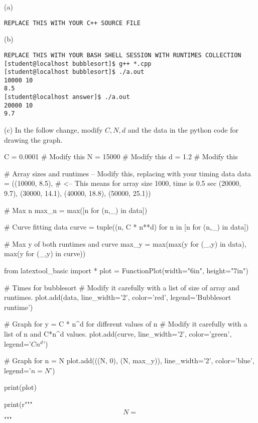 
(a)
\begin{Verbatim}[frame=single, fontsize=\small]
REPLACE THIS WITH YOUR C++ SOURCE FILE
\end{Verbatim}

(b)
\begin{Verbatim}[frame=single, fontsize=\small]
REPLACE THIS WITH YOUR BASH SHELL SESSION WITH RUNTIMES COLLECTION
[student@localhost bubblesort]$ g++ *.cpp
[student@localhost bubblesort]$ ./a.out
10000 10
8.5
[student@localhost answer]$ ./a.out
20000 10
9.7
\end{Verbatim}

(c) In the follow change, modify $C, N, d$ and the data in the
python code for drawing the graph.

\begin{python}
C = 0.0001                  # Modify this 
N = 15000                   # Modify this
d = 1.2                     # Modify this

# Array sizes and runtimes -- Modify this, replacing with your timing data
data = ((10000, 8.5),    # <-- This means for array size 1000, time is 0.5 sec
        (20000, 9.7),
        (30000, 14.1),
        (40000, 18.8),
        (50000, 25.1))

# Max n
max_n = max([n for (n,_) in data])

# Curve fitting data
curve = tuple((n, C * n**d) for n in [n for (n,_) in data])

# Max y of both runtimes and curve
max_y = max(max(y for (_,y) in data), max(y for (_,y) in curve))

from latextool_basic import *
plot = FunctionPlot(width="6in", height="7in")

# Times for bubblesort
# Modify it carefully with a list of size of array and runtimes.
plot.add(data, line_width='2', color='red', legend='Bubblesort runtime')

# Graph for y = C * n^d for different values of n
# Modify it carefully with a list of n and C*n^d values.
plot.add(curve,
         line_width='2', color='green', legend='$Cn^{d}$')

# Graph for n = N
plot.add(((N, 0),
          (N, max_y)),
          line_width='2', color='blue', legend='$n = N$')

print(plot)

print(r"""
\[
N = %
\]
""" %
\end{python}

